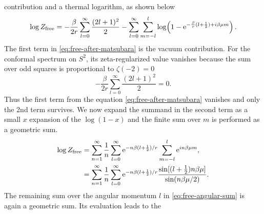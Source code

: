 \documentclass[a4paper,11pt]{article}
\newcommand{\e}{\mathrm e}
\begin{document}
contribution and a thermal logarithm, as shown below
\begin{equation}
 \log Z_{\rm free}
 =-\frac{\beta}{2r}\sum_{l=0}^{\infty}\frac{(2l+1)^2}{2}
 -\sum_{l=0}^{\infty}\sum_{m=-l}^{l}
 \log\!\left(
 1-\e^{-\frac{\beta}{r}(l+\frac12)+i\beta\mu m}
 \right).
 \label{eq:free-after-matsubara}
\end{equation}
The first term in \eqref{eq:free-after-matsubara} is the vacuum contribution.
For the conformal spectrum on $S^2$, its zeta-regularized value vanishes
because the sum over odd squares is proportional to $\zeta(-2)=0$
\begin{equation}
 -\frac{\beta}{2r}\sum_{l=0}^{\infty}\frac{(2l+1)^2}{2}
 =0.
 \label{eq:free-vacuum-zero}
\end{equation}
Thus the first term from the equation  \eqref{eq:free-after-matsubara} vanishes and only the 2nd term survives.
  We now expand the summand in the second term as a small $x$ expansion of the $\log (1-x)$ and the finite sum over $m$ is performed as a geometric sum.
\begin{align}
 \log Z_{\rm free}
 &=\sum_{n=1}^{\infty}\frac1n
 \sum_{l=0}^{\infty}\e^{-n\beta(l+\frac12)/r}
 \sum_{m=-l}^{l}\e^{in\beta\mu m}
 \nonumber,\\
 &=\sum_{n=1}^{\infty}\frac1n
 \sum_{l=0}^{\infty}\e^{-n\beta(l+\frac12)/r}
 \frac{\sin[(l+\frac12)n\beta\mu]}{\sin(n\beta\mu/2)}.
 \label{eq:free-angular-sum}
\end{align}
The remaining sum over the angular momentum $l$ in
\eqref{eq:free-angular-sum} is again a geometric sum.  Its evaluation leads to the
\end{document}

